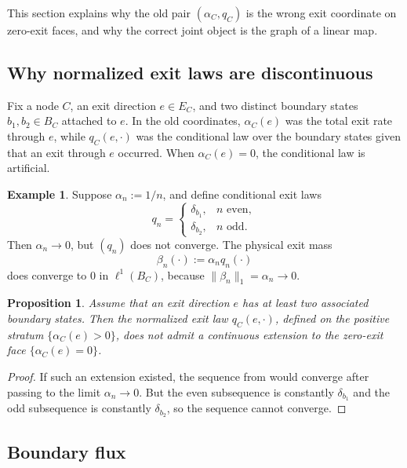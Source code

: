 \documentclass[12pt]{article}
\newtheorem{proposition}[theorem]{Proposition}
\theoremstyle{definition}
\newtheorem{example}[theorem]{Example}
\newcommand{\1}{\mathbf{1}}
\begin{document}
This section explains why the old pair \((\alpha_C,q_C)\) is the wrong exit coordinate on
zero-exit faces, and why the correct joint object is the graph of a linear map.

\subsection{Why normalized exit laws are discontinuous}

Fix a node \(C\), an exit direction \(e\in E_C\), and two distinct boundary states
\(b_1,b_2\in B_C\) attached to \(e\).  In the old coordinates, \(\alpha_C(e)\) was the
total exit rate through \(e\), while \(q_C(e,\cdot)\) was the conditional law over the
boundary states given that an exit through \(e\) occurred.  When \(\alpha_C(e)=0\), the
conditional law is artificial.

\begin{example}
\label{ex:alternating}
Suppose \(\alpha_n:=1/n\), and define conditional exit laws
\[
q_n=
\begin{cases}
\delta_{b_1}, & n \text{ even},\\
\delta_{b_2}, & n \text{ odd}.
\end{cases}
\]
Then \(\alpha_n\to 0\), but \((q_n)\) does not converge.  The physical exit mass
\[
\beta_n(\cdot):=\alpha_n q_n(\cdot)
\]
does converge to \(0\) in \(\ell^1(B_C)\), because \(\|\beta_n\|_1=\alpha_n\to 0\).
\end{example}

\begin{proposition}
\label{prop:no-continuous-q}
Assume that an exit direction \(e\) has at least two associated boundary states.  Then the
normalized exit law \(q_C(e,\cdot)\), defined on the positive stratum
\(\{\alpha_C(e)>0\}\), does not admit a continuous extension to the zero-exit face
\(\{\alpha_C(e)=0\}\).
\end{proposition}

\begin{proof}
If such an extension existed, the sequence from  would converge after
passing to the limit \(\alpha_n\to 0\).  But the even subsequence is constantly
\(\delta_{b_1}\) and the odd subsequence is constantly \(\delta_{b_2}\), so the sequence
cannot converge.
\end{proof}

\subsection{Boundary flux}
\end{document}
